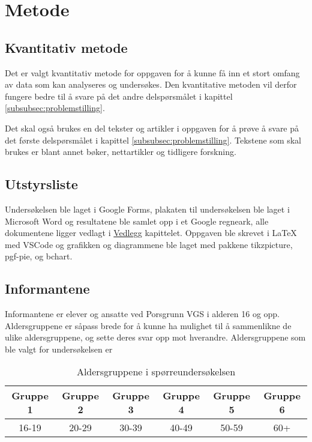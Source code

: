 \section{Metode}

\subsection{Kvantitativ metode}
Det er valgt kvantitativ metode for oppgaven for å kunne få inn et stort omfang av data som kan analyseres og undersøkes. Den kvantitative metoden vil derfor fungere bedre til å svare på det andre delspørsmålet i kapittel \ref{subsubsec:problemstilling}.

Det skal også brukes en del tekster og artikler i oppgaven for å prøve å svare på det første delspørsmålet i kapittel \ref{subsubsec:problemstilling}. Tekstene som skal brukes er blant annet bøker, nettartikler og tidligere forskning.

\subsection{Utstyrsliste}
Undersøkelsen ble laget i Google Forms, plakaten til undersøkelsen ble laget i Microsoft Word og resultatene ble samlet opp i et Google regneark, alle dokumentene ligger vedlagt i \hyperref[vedlegg]{Vedlegg} kapittelet. Oppgaven ble skrevet i \LaTeX{} med VSCode og grafikken og diagrammene ble laget med pakkene tikzpicture, pgf-pie, og bchart.  

\subsection{Informantene}
Informantene er elever og ansatte ved Porsgrunn VGS i alderen 16 og opp. Aldersgruppene er såpass brede for å kunne ha mulighet til å sammenlikne de ulike aldersgruppene, og sette deres svar opp mot hverandre. Aldersgruppene som ble valgt for undersøkelsen er

\begin{table}[h]
    \begin{center}
        \begin{tabular}{|c|c|c|c|c|c|}
            \hline
            Gruppe 1 & Gruppe 2 & Gruppe 3 & Gruppe 4 & Gruppe 5 & Gruppe 6 \\
            \hline
            16-19 & 20-29 & 30-39 & 40-49 & 50-59 & 60+ \\
            \hline
        \end{tabular}
        \caption{Aldersgruppene i spørreundersøkelsen}
    \end{center}
\end{table}

